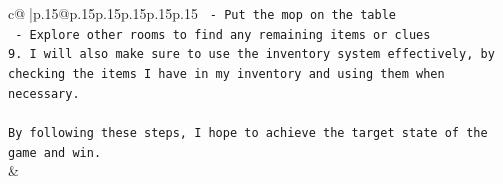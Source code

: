 \documentclass{article}
\begin{document}
{\begin{supertabular}{c@{$\;$}|p{.15\linewidth}@{}p{.15\linewidth}p{.15\linewidth}p{.15\linewidth}p{.15\linewidth}p{.15\linewidth}}
{{{\texttt{   {-} Put the mop on the table} \\
\texttt{   {-} Explore other rooms to find any remaining items or clues} \\
\texttt{9. I will also make sure to use the inventory system effectively, by checking the items I have in my inventory and using them when necessary.} \\
\\ 
\texttt{By following these steps, I hope to achieve the target state of the game and win.} \\
            }
        }
    }
    & \\ \\

\end{supertabular}
}
\end{document}

